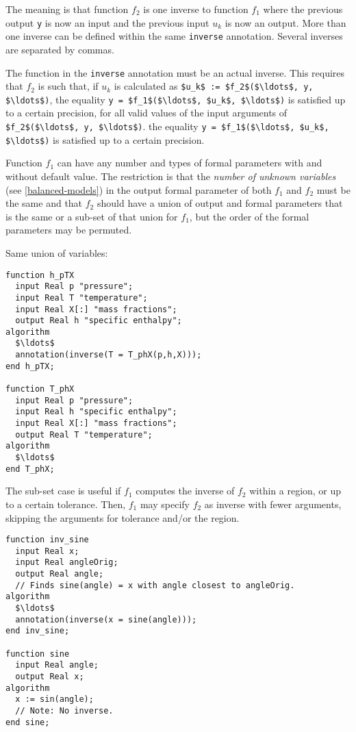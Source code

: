 The meaning is that function $f_2$ is one inverse to function $f_1$ where the previous output \lstinline!y! is now an input and the previous input $u_k$ is now an output.
More than one inverse can be defined within the same \lstinline!inverse! annotation.
Several inverses are separated by commas.

The function in the \lstinline!inverse! annotation must be an actual inverse.
This requires that $f_2$ is such that, if $u_k$ is calculated as \lstinline!$u_k$ := $f_2$($\ldots$, y, $\ldots$)!, the equality \lstinline!y = $f_1$($\ldots$, $u_k$, $\ldots$)! is satisfied up to a certain precision, for all valid values of the input arguments of \lstinline!$f_2$($\ldots$, y, $\ldots$)!.
the equality \lstinline!y = $f_1$($\ldots$, $u_k$, $\ldots$)! is satisfied up to a certain precision.

Function $f_1$ can have any number and types of formal parameters with and without default value.
The restriction is that the \emph{number of unknown variables} (see \cref{balanced-models}) in the output formal parameter of both $f_1$ and $f_2$ must be the same and that $f_2$ should have a union of output and formal parameters that is the same or a sub-set of that union for $f_1$, but the order of the formal parameters may be permuted.

\begin{example}
Same union of variables:
\begin{lstlisting}[language=modelica]
function h_pTX
  input Real p "pressure";
  input Real T "temperature";
  input Real X[:] "mass fractions";
  output Real h "specific enthalpy";
algorithm
  $\ldots$
  annotation(inverse(T = T_phX(p,h,X)));
end h_pTX;

function T_phX
  input Real p "pressure";
  input Real h "specific enthalpy";
  input Real X[:] "mass fractions";
  output Real T "temperature";
algorithm
  $\ldots$
end T_phX;
\end{lstlisting}
\end{example}

The sub-set case is useful if $f_1$ computes the inverse of $f_2$ within a region, or up to a certain tolerance.
Then, $f_1$ may specify $f_2$ as inverse with fewer arguments, skipping the arguments for tolerance and/or the region.

\begin{example}

\begin{lstlisting}[language=modelica]
function inv_sine
  input Real x;
  input Real angleOrig;
  output Real angle;
  // Finds sine(angle) = x with angle closest to angleOrig.
algorithm
  $\ldots$
  annotation(inverse(x = sine(angle)));
end inv_sine;

function sine
  input Real angle;
  output Real x;
algorithm
  x := sin(angle);
  // Note: No inverse.
end sine;
\end{lstlisting}
\end{example}


